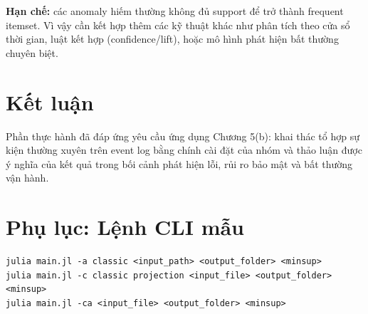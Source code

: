 \documentclass[12pt,a4paper]{article}
\begin{document}
\noindent \textbf{Hạn chế:} các anomaly hiếm thường không đủ support để trở thành frequent itemset. Vì vậy cần kết hợp thêm các kỹ thuật khác như phân tích theo cửa sổ thời gian, luật kết hợp (confidence/lift), hoặc mô hình phát hiện bất thường chuyên biệt.

\section{Kết luận}
Phần thực hành đã đáp ứng yêu cầu ứng dụng Chương 5(b): khai thác tổ hợp sự kiện thường xuyên trên event log bằng chính cài đặt của nhóm và thảo luận được ý nghĩa của kết quả trong bối cảnh phát hiện lỗi, rủi ro bảo mật và bất thường vận hành.

\section*{Phụ lục: Lệnh CLI mẫu}
\begin{verbatim}
julia main.jl -a classic <input_path> <output_folder> <minsup>
julia main.jl -c classic projection <input_file> <output_folder> <minsup>
julia main.jl -ca <input_file> <output_folder> <minsup>
\end{verbatim}
\end{document}
